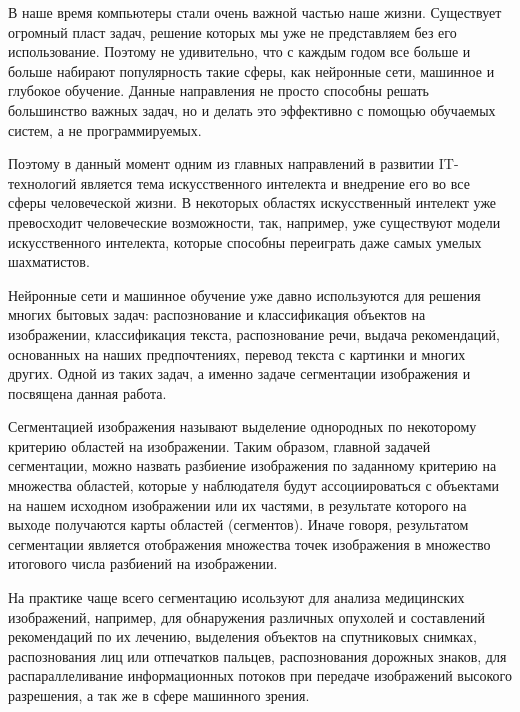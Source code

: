 \documentclass[bachelor, och, coursework]{shiza}
\begin{document}

\tableofcontents

\intro

В наше время компьютеры стали очень важной частью наше жизни. Существует огромный пласт задач, решение 
которых мы уже не представляем без его использование. Поэтому не удивительно, что с каждым годом все больше 
и больше набирают популярность такие сферы, как нейронные сети, машинное и глубокое обучение. Данные направления
не просто способны решать большинство важных задач, но и делать это эффективно с помощью обучаемых систем, а
не программируемых.

Поэтому в данный момент одним из главных направлений в развитии IT-технологий является тема искусственного
интелекта и внедрение его во все сферы человеческой жизни. В некоторых областях искусственный интелект уже
превосходит человеческие возможности, так, например, уже существуют модели искусственного интелекта, которые
способны переиграть даже самых умелых шахматистов.

Нейронные сети и машинное обучение уже давно используются для решения многих бытовых задач: распознование и классификация 
объектов на изображении, классификация текста, распознование речи, выдача рекомендаций, основанных на наших предпочтениях, 
перевод текста с картинки и многих других. Одной из таких задач, а именно задаче сегментации изображения и посвящена 
данная работа.

Сегментацией изображения называют выделение однородных по некоторому критерию областей на изображении.
Таким образом, главной задачей сегментации, можно назвать разбиение изображения по заданному критерию 
на множества областей, которые у наблюдателя будут ассоциироваться с объектами на нашем исходном изображении 
или их частями, в результате которого на выходе получаются карты областей (сегментов). Иначе говоря, 
результатом сегментации является отображения множества точек изображения в множество итогового числа
разбиений на изображении. 

На практике чаще всего сегментацию исользуют для анализа медицинских изображений, например, для обнаружения 
различных опухолей и составлений рекомендаций по их лечению, выделения объектов на спутниковых снимках, 
распознования лиц или отпечатков пальцев, распознования дорожных знаков, для распараллеливание информационных 
потоков при передаче изображений высокого разрешения, а так же в сфере машинного зрения.
\end{document}
